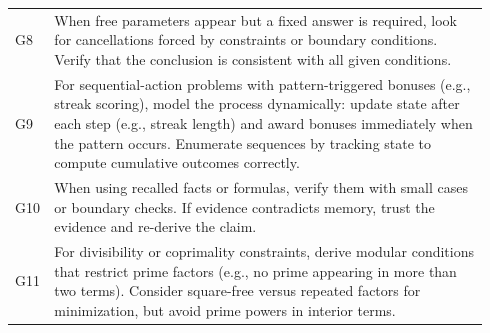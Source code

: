 \documentclass{article}
\theoremstyle{plain}
\theoremstyle{definition}
\theoremstyle{remark}
\begin{document}
\begin{table}[t]
\begin{tabular}{p{0.04\linewidth} p{0.9\linewidth}}
G8 & When free parameters appear but a fixed answer is required, look for cancellations forced by constraints or boundary conditions. Verify that the conclusion is consistent with all given conditions. \\

G9 & For sequential-action problems with pattern-triggered bonuses (e.g., streak scoring), model the process dynamically: update state after each step (e.g., streak length) and award bonuses immediately when the pattern occurs. Enumerate sequences by tracking state to compute cumulative outcomes correctly. \\

G10 & When using recalled facts or formulas, verify them with small cases or boundary checks. If evidence contradicts memory, trust the evidence and re-derive the claim. \\

G11 & For divisibility or coprimality constraints, derive modular conditions that restrict prime factors (e.g., no prime appearing in more than two terms). Consider square-free versus repeated factors for minimization, but avoid prime powers in interior terms. \\
\bottomrule
\end{tabular}
\end{table}
\end{document}
